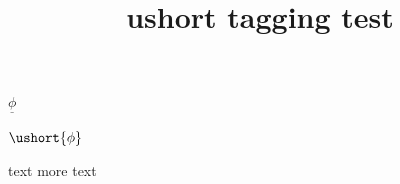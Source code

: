 \documentclass{article}
\title{ushort tagging test}
\begin{document}
$\underline{\phi}$

$\ushort{\phi}$

text \ushort{\phi} more text

\ushortw{\Phi+\Omega}

\ushortd{\psi}

\ushortdw{\Psi+\Lambda}
\end{document}
